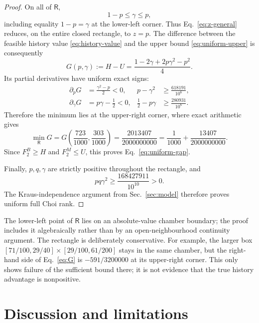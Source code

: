 \documentclass[11pt]{article}
\begin{document}
\begin{proof}
On all of $\mathsf R$,
\begin{equation}
 1-p\le\gamma\le p,
\end{equation}
including equality $1-p=\gamma$ at the lower-left corner. Thus
Eq.~\eqref{eq:z-general} reduces, on the entire closed rectangle, to $z=p$.
The difference between the feasible history value \eqref{eq:history-value} and
the upper bound \eqref{eq:uniform-upper} is consequently
\begin{equation}
 G(p,\gamma):=H-U
 =\frac{1-2\gamma+2p\gamma^2-p^2}{4}.
 \label{eq:G}
\end{equation}
Its partial derivatives have uniform exact signs:
\begin{align}
 \partial_pG&=\frac{\gamma^2-p}{2}<0,
 &p-\gamma^2&\ge\frac{618191}{10^6},\label{eq:p-margin}\\
 \partial_\gamma G&=p\gamma-\frac12<0,
 &\frac12-p\gamma&\ge\frac{280931}{10^6}.
 \label{eq:gamma-margin}
\end{align}
Therefore the minimum lies at the upper-right corner, where exact arithmetic gives
\begin{equation}
 \min_{\mathsf R}G
 =G\!\left(\frac{723}{1000},\frac{303}{1000}\right)
 =\frac{2013407}{2000000000}
 =\frac1{1000}+\frac{13407}{2000000000}.
 \label{eq:corner-value}
\end{equation}
Since $F_2^B\ge H$ and $F_2^M\le U$, this proves
Eq.~\eqref{eq:uniform-gap}.

Finally, $p,q,\gamma$ are strictly positive throughout the rectangle, and
\begin{equation}
 pq\gamma^2\ge\frac{168427911}{10^{10}}>0.
\end{equation}
The Kraus-independence argument from Sec.~\ref{sec:model} therefore proves uniform
full Choi rank.
\end{proof}

The lower-left point of $\mathsf R$ lies on an absolute-value chamber boundary;
the proof includes it algebraically rather than by an open-neighbourhood continuity
argument. The rectangle is deliberately conservative. For example, the larger box
$[71/100,29/40]\times[29/100,61/200]$ stays in the same chamber, but the
right-hand side of Eq.~\eqref{eq:G} is $-591/3200000$ at its upper-right corner.
This only shows failure of the sufficient bound there; it is not evidence that the
true history advantage is nonpositive.

\section{Discussion and limitations}
\label{sec:discussion}
\end{document}
